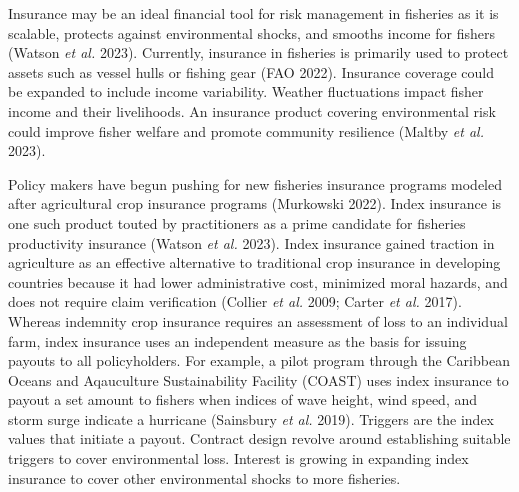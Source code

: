 \documentclass[
  letterpaper,
  DIV=11,
  numbers=noendperiod]{scrartcl}
\theoremstyle{plain}
\theoremstyle{plain}
\theoremstyle{remark}
\begin{document}
Insurance may be an ideal financial tool for risk management in
fisheries as it is scalable, protects against environmental shocks, and
smooths income for fishers (Watson \emph{et al.} 2023). Currently,
insurance in fisheries is primarily used to protect assets such as
vessel hulls or fishing gear (FAO 2022). Insurance coverage could be
expanded to include income variability. Weather fluctuations impact
fisher income and their livelihoods. An insurance product covering
environmental risk could improve fisher welfare and promote community
resilience (Maltby \emph{et al.} 2023).

Policy makers have begun pushing for new fisheries insurance programs
modeled after agricultural crop insurance programs (Murkowski 2022).
Index insurance is one such product touted by practitioners as a prime
candidate for fisheries productivity insurance (Watson \emph{et al.}
2023). Index insurance gained traction in agriculture as an effective
alternative to traditional crop insurance in developing countries
because it had lower administrative cost, minimized moral hazards, and
does not require claim verification (Collier \emph{et al.} 2009; Carter
\emph{et al.} 2017). Whereas indemnity crop insurance requires an
assessment of loss to an individual farm, index insurance uses an
independent measure as the basis for issuing payouts to all
policyholders. For example, a pilot program through the Caribbean Oceans
and Aqauculture Sustainability Facility (COAST) uses index insurance to
payout a set amount to fishers when indices of wave height, wind speed,
and storm surge indicate a hurricane (Sainsbury \emph{et al.} 2019).
Triggers are the index values that initiate a payout. Contract design
revolve around establishing suitable triggers to cover environmental
loss. Interest is growing in expanding index insurance to cover other
environmental shocks to more fisheries.
\end{document}
